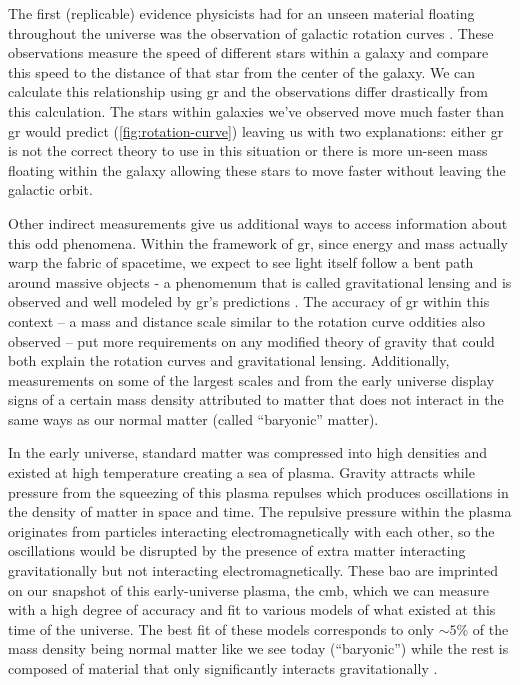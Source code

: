 The first (replicable) evidence physicists had for an unseen material floating throughout the
universe was the observation of galactic rotation curves
\cite{rubin-rotationcurve-1980,rotationcurve-2000}. These observations measure the speed of
different stars within a galaxy and compare this speed to the distance of that star from the center
of the galaxy. We can calculate this relationship using \ac{gr}
\cite{rotationcurve-predictions-2007} and the observations differ drastically from this
calculation. The stars within galaxies we've observed move much faster than \ac{gr} would predict
(\cref{fig:rotation-curve}) leaving us with two explanations: either \ac{gr} is not the correct
theory to use in this situation or there is more un-seen mass floating within the galaxy allowing
these stars to move faster without leaving the galactic orbit.

Other indirect measurements give us additional ways to access information about this odd phenomena.
Within the framework of \ac{gr}, since energy and mass actually warp the fabric of spacetime, we
expect to see light itself follow a bent path around massive objects - a phenomenum that is called
gravitational lensing and is observed and well modeled by \ac{gr}'s predictions
\cite{gravlensing-2004}. The accuracy of \ac{gr} within this context -- a mass and distance scale
similar to the rotation curve oddities also observed -- put more requirements on any modified
theory of gravity that could both explain the rotation curves and gravitational lensing.
Additionally, measurements on some of the largest scales and from the early universe display signs
of a certain mass density attributed to matter that does not interact in the same ways as our normal
matter (called ``baryonic'' matter).

In the early universe, standard matter was compressed into high densities and existed at high
temperature creating a sea of plasma. Gravity attracts while pressure from the squeezing of this
plasma repulses which produces oscillations in the density of matter in space and time. The
repulsive pressure within the plasma originates from particles interacting electromagnetically with
each other, so the oscillations would be disrupted by the presence of extra matter interacting
gravitationally but not interacting electromagnetically. These \ac{bao} are imprinted on our
snapshot of this early-universe plasma, the \ac{cmb}, which we can measure with a high degree of
accuracy and fit to various models of what existed at this time of the universe. The best fit of
these models corresponds to only $\sim 5\%$ of the mass density being normal matter like we see
today (``baryonic'') while the rest is composed of material that only significantly interacts
gravitationally \cite{planck-cmb-2015}.

